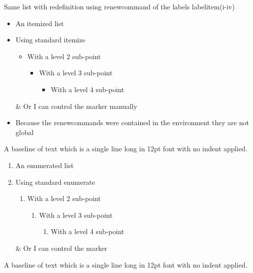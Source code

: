 \documentclass[12pt,a4paper,onecolumn]{article}
\begin{document}
Same list with redefinition using renewcommand of the labels labelitem(i-iv)
\begin{itemize}
\renewcommand{\labelitemi}{*}
\renewcommand{\labelitemii}{**}
\renewcommand{\labelitemiii}{***}
\renewcommand{\labelitemiv}{****}
\item An itemized list
\item Using standard itemize
\begin{itemize}
\item With a level 2 sub-point
\begin{itemize}
\item With a level 3 sub-point
\begin{itemize}
\item With a level 4 sub-point
\end{itemize}
\end{itemize}
\end{itemize}
\item[\&] Or I can control the marker manually
\end{itemize}

\begin{itemize}
\item Because the renewcommands were contained in the environment they are not global
\end{itemize}

\noindent
A baseline of text which is a single line long in 12pt font with no indent applied.

\begin{enumerate}
\item An enumerated list
\item Using standard enumerate
\begin{enumerate}
\item With a level 2 sub-point
\begin{enumerate}
\item With a level 3 sub-point
\begin{enumerate}
\item With a level 4 sub-point
\end{enumerate}
\end{enumerate}
\end{enumerate}
\item[\&] Or I can control the marker
\end{enumerate}

\noindent
A baseline of text which is a single line long in 12pt font with no indent applied.
\end{document}
